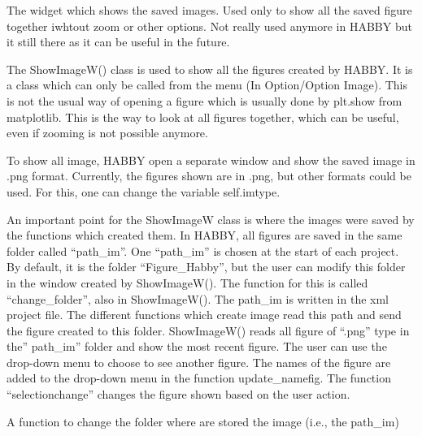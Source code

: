 \documentclass[letterpaper,10pt,english]{sphinxmanual}
\begin{document}
\begin{fulllineitems}
\label{\detokenize{index:src_GUI.Main_windows_1.ShowImageW}}
The widget which shows the saved images. Used only to show all the saved figure together iwhtout zoom or other
options. Not really used anymore in HABBY but it still there as it can be useful in the future.


The ShowImageW() class is used to show all the figures created by HABBY. It is a class which can only be
called from the menu (In Option/Option Image). This is not the usual way of opening a figure which is usually done
by plt.show from matplotlib. This is the way to look at all figures  together, which can be useful, even if zooming
is not possible anymore.

To show all image, HABBY open a separate window and show the saved image in .png format.  Currently, the figures
shown are in .png, but other formats could be used. For this, one can change the variable self.imtype.

An important point for the ShowImageW  class  is where the images were saved by the functions which created them.
In HABBY, all figures are saved in the same folder called “path\_im”. One “path\_im” is chosen at the start of each
project. By default, it is the folder “Figure\_Habby”, but the user can modify this folder in the window created by
ShowImageW(). The function for this is called “change\_folder”, also in ShowImageW(). The path\_im is written in
the xml project file. The different functions which create image read this path and send the figure created
to this folder. ShowImageW() reads all  figure of “.png” type in the” path\_im” folder and show the most recent
figure. The user can use the drop-down menu to choose to see another figure. The names of the figure are added to
the drop-down menu in the function update\_namefig. The function ``selectionchange'' changes the figure shown based
on the user action.

\begin{fulllineitems}
\label{\detokenize{index:src_GUI.Main_windows_1.ShowImageW.change_folder}}
A function to change the folder where are stored the image (i.e., the path\_im)


\end{fulllineitems}
\end{fulllineitems}
\end{document}

